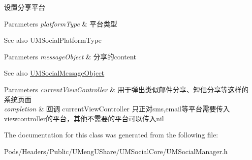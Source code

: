 设置分享平台


\begin{DoxyParams}{Parameters}
{\em platform\+Type} & 平台类型 \\
\hline
\end{DoxyParams}
\begin{DoxySeeAlso}{See also}
U\+M\+Social\+Platform\+Type 
\end{DoxySeeAlso}

\begin{DoxyParams}{Parameters}
{\em message\+Object} & 分享的content \\
\hline
\end{DoxyParams}
\begin{DoxySeeAlso}{See also}
\mbox{\hyperlink{interface_u_m_social_message_object}{U\+M\+Social\+Message\+Object}} 
\end{DoxySeeAlso}

\begin{DoxyParams}{Parameters}
{\em current\+View\+Controller} & 用于弹出类似邮件分享、短信分享等这样的系统页面 \\
\hline
{\em completion} & 回调  current\+View\+Controller 只正对sms,email等平台需要传入viewcontroller的平台，其他不需要的平台可以传入nil \\
\hline
\end{DoxyParams}


The documentation for this class was generated from the following file\+:\begin{DoxyCompactItemize}
\item 
Pods/\+Headers/\+Public/\+U\+Meng\+U\+Share/\+U\+M\+Social\+Core/U\+M\+Social\+Manager.\+h\end{DoxyCompactItemize}
